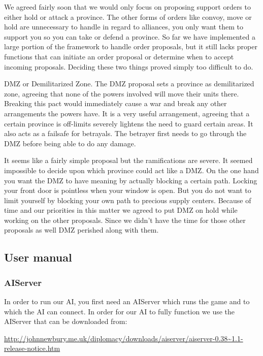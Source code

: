 \documentclass[a4paper]{article} %
\begin{document}
We agreed fairly soon that we would only focus on proposing support orders to either hold or attack a province. The other forms of orders like convoy, move or hold are unnecessary to handle in regard to alliances, you only want them to support you so you can take or defend a province. So far we have implemented a large portion of the framework to handle order proposals, but it still lacks proper functions that can initiate an order proposal or determine when to accept incoming proposals. Deciding these two things proved simply too difficult to do.  

DMZ or Demilitarized Zone. The DMZ proposal sets a province as demilitarized zone, agreeing that none of the powers involved will move their units there. Breaking this pact would immediately cause a war and break any other arrangements the powers have. It is a very useful arrangement, agreeing that a certain province is off-limits severely lightens the need to guard certain areas. It also acts as a failsafe for betrayals. The betrayer first needs to go through the DMZ before being able to do any damage.

It seems like a fairly simple proposal but the ramifications are severe. It seemed impossible to decide upon which province could act like a DMZ. On the one hand you want the DMZ to have meaning by actually blocking a certain path. Locking your front door is pointless when your window is open. But you do not want to limit yourself by blocking your own path to precious supply centers. Because of time and our priorities in this matter we agreed to put DMZ on hold while working on the other proposals. Since we didn’t have the time for those other proposals as well DMZ perished along with them. 

\subsection{User manual}

\subsubsection{AIServer}
In order to run our AI, you first need an AIServer which runs the game and to which the AI can connect. In order for our AI to fully function we use the AIServer that can be downloaded from: 

\begin{sloppypar}
\noindent\url{http://johnnewbury.me.uk/diplomacy/downloads/aiserver/aiserver-0.38~1.1-release-notice.htm}
\end{sloppypar}
\end{document}

